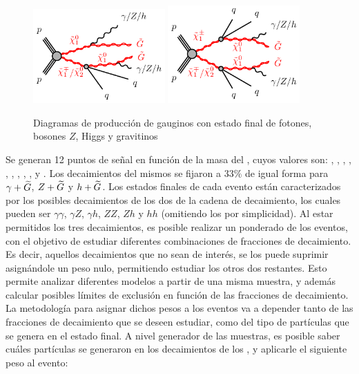 \begin{figure}
  \centering
  \includegraphics[width=0.45\textwidth]{images/analysis_EWK/N1N2C1-qqZhphGG-GGM.pdf}%
  \includegraphics[width=0.45\textwidth]{images/analysis_EWK/C1C1N2-qqqqZhphGG-GGM.pdf}
  \caption{Diagramas de producción de gauginos con estado final de fotones, bosones $Z$, Higgs y gravitinos}
  \label{fig:EWK_GGM_diagrams}
\end{figure}


Se generan 12 puntos de señal en función de la masa del \ninoone, cuyos valores son: , , , , , , , , ,  y . Los decaimientos del mismos se fijaron a $33\%$ de igual forma para $\gamma + \widetilde{G}$, $Z + \widetilde{G}$ y $h + \widetilde{G}$. Los estados finales de cada evento están caracterizados por los posibles decaimientos de los dos \ninoone de la cadena de decaimiento, los cuales pueden ser $\gamma\gamma$, $\gamma Z$, $\gamma h$, $ZZ$, $Zh$ y $hh$ (omitiendo los \gravino por simplicidad). Al estar permitidos los tres decaimientos, es posible realizar un ponderado de los eventos, con el objetivo de estudiar diferentes combinaciones de fracciones de decaimiento. Es decir, aquellos decaimientos que no sean de interés, se los puede suprimir asignándole un peso nulo, permitiendo estudiar los otros dos restantes. Esto permite analizar diferentes modelos a partir de una misma muestra, y además calcular posibles límites de exclusión en función de las fracciones de decaimiento.
La metodología para asignar dichos pesos a los eventos va a depender tanto de las fracciones de decaimiento que se deseen estudiar, como del tipo de partículas que se genera en el estado final. A nivel generador de las muestras, es posible saber cuáles partículas se generaron en los decaimientos de los \ninoone, y aplicarle el siguiente peso al evento:

